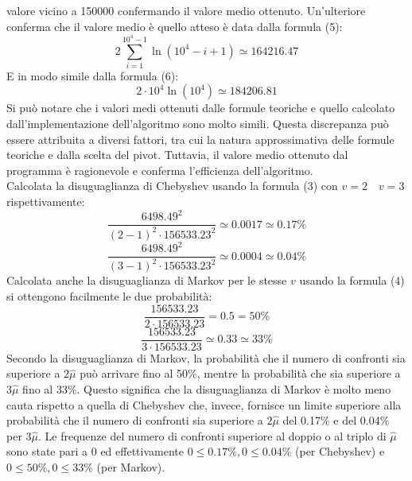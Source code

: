 \documentclass[12pt]{article}
\begin{document}
valore vicino a 150000 confermando il valore medio ottenuto.
Un'ulteriore conferma che il valore medio è quello atteso è data dalla 
formula (5):
\begin{equation*}
    2\sum_{i=1}^{10^{4}-1}\ln(10^{4}-i+1) \simeq 164216.47
\end{equation*}
E in modo simile dalla formula (6):
\begin{equation*}
     2\cdot 10^{4}\ln(10^{4}) \simeq 184206.81
\end{equation*}
Si può notare che i valori medi ottenuti dalle formule teoriche e quello
calcolato dall'implementazione dell'algoritmo sono molto simili.
Questa discrepanza può essere attribuita a diversi fattori, tra cui la natura
approssimativa delle formule teoriche e dalla scelta del pivot. Tuttavia,
il valore medio ottenuto dal programma è ragionevole e conferma l'efficienza
dell'algoritmo.\\
Calcolata la disuguaglianza di Chebyshev usando la formula (3)
con $v=2 \quad v=3$ rispettivamente:
\begin{equation*}
    \frac{6498.49^{2}}{(2-1)^{2}\cdot 156533.23^{2}} \simeq 0.0017 
    \simeq 0.17\%
\end{equation*}
\begin{equation*}
    \frac{6498.49^{2}}{(3-1)^{2}\cdot 156533.23^{2}} \simeq 0.0004 
    \simeq 0.04\%
\end{equation*}
Calcolata anche la disuguaglianza di Markov per le stesse $v$ usando la
formula (4) si ottengono facilmente le due probabilità:
\begin{equation*}
    \frac{156533.23}{2\cdot 156533.23} = 0.5 = 50\%
\end{equation*}
\begin{equation*}
    \frac{156533.23}{3\cdot 156533.23} \simeq 0.33 \simeq 33\%
\end{equation*}
Secondo la disuguaglianza di Markov, la probabilità che il numero di 
confronti sia superiore a $2\hat{\mu}$ può arrivare fino al 50\%, mentre 
la probabilità che sia superiore a $3\hat{\mu}$ fino al 33\%. Questo 
significa che la disuguaglianza di Markov è molto meno cauta rispetto a 
quella di Chebyshev che, invece, fornisce un limite superiore alla 
probabilità che il numero di confronti sia superiore a $2\hat{\mu}$ del 
0.17\% e del 0.04\% per $3\hat{\mu}$.
Le frequenze del numero di confronti superiore al doppio o al triplo di 
$\hat{\mu}$ sono state pari a 0 ed effettivamente 
$0\leq 0.17\%,0\leq 0.04\%$ (per Chebyshev) e $0\leq 50\%,0\leq 33\%$ 
(per Markov).
\end{document}
